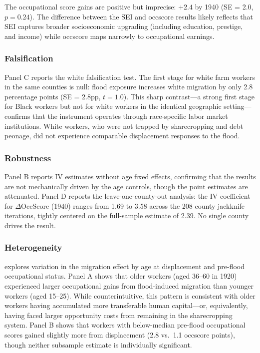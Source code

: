 \documentclass[12pt]{article}
\begin{document}
The occupational score gains are positive but imprecise: $+2.4$ by 1940 (SE = 2.0, $p = 0.24$). The difference between the SEI and occscore results likely reflects that SEI captures broader socioeconomic upgrading (including education, prestige, and income) while occscore maps narrowly to occupational earnings.




\subsubsection*{Falsification}  Panel C reports the white falsification test. The first stage for white farm workers in the same counties is null: flood exposure increases white migration by only 2.8 percentage points (SE = 2.8pp, $t = 1.0$). This sharp contrast---a strong first stage for Black workers but not for white workers in the identical geographic setting---confirms that the instrument operates through race-specific labor market institutions. White workers, who were not trapped by sharecropping and debt peonage, did not experience comparable displacement responses to the flood.

\subsubsection*{Robustness}  Panel B reports IV estimates without age fixed effects, confirming that the results are not mechanically driven by the age controls, though the point estimates are attenuated. Panel D reports the leave-one-county-out analysis: the IV coefficient for $\Delta$OccScore (1940) ranges from 1.69 to 3.58 across the 208 county jackknife iterations, tightly centered on the full-sample estimate of 2.39. No single county drives the result.




\subsubsection*{Heterogeneity}  explores variation in the migration effect by age at displacement and pre-flood occupational status. Panel A shows that older workers (aged 36--60 in 1920) experienced larger occupational gains from flood-induced migration than younger workers (aged 15--25). While counterintuitive, this pattern is consistent with older workers having accumulated more transferable human capital---or, equivalently, having faced larger opportunity costs from remaining in the sharecropping system. Panel B shows that workers with below-median pre-flood occupational scores gained slightly more from displacement (2.8 vs.\ 1.1 occscore points), though neither subsample estimate is individually significant.
\end{document}
